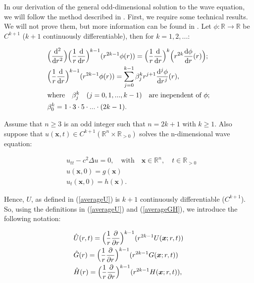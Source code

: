 \documentclass[a4paper, 12pt]{article}
\numberwithin{equation}{section}
\begin{document}
In our derivation of the general odd-dimensional solution to the wave equation,
we will follow the method described in \cite[Ch. 2.4.1.d]{Ev}. First, we require some
technical results. We will not prove them, but more information can be found in
\cite[Lemma 2]{Ev}. Let $\phi:\mathbb{R} \to \mathbb{R}$ be $C^{k+1}$ ($k+1$
continuously differentiable), then for $k=1, 2, ...$:

\begin{align}
    &\Big(\diff[2]{}{r}\Big)\Big( \frac{1}{r} \diff{}{r}\Big)^{k-1}(r^{2k-1}\phi(r))=\Big( \frac{1}{r} \diff{}{r}\Big)^k \Big(r^{2k} \diff{\phi}{r}(r) \Big); \label{i} \\
    &\Big( \frac{1}{r} \diff{}{r}\Big)^{k-1}(r^{2k-1}\phi(r))=\sum^{k-1}_{j=0} \beta_{j}^{k} r^{j+1} \diff[j]{\phi}{r}(r), \label{ii} \\
    & \textrm{where} \quad \beta_{j}^{k} \quad (j=0,1,...,k-1) \quad \textrm{are inependent of $\phi$}; \notag \\
    & \beta_{0}^{k}=1 \cdot 3 \cdot 5 \cdot ... \cdot (2k-1). \label{iii}
\end{align}

Assume that $n \ge 3$ is an odd integer such that $n=2k+1$ with $k \ge 1$. Also
suppose that $u(\boldsymbol{x},t) \in C^{k+1}(\mathbb{R}^n \times \mathbb{R}_{>0})$
solves the n-dimensional wave equation:

\begin{equation} \label{ndimeq}
    \begin{aligned}
        &u_{tt}-c^2\Delta u =0, \quad \textrm{with} \quad \boldsymbol{x} \in \mathbb{R}^n, \quad t \in \mathbb{R}_{>0}\\
        &u(\boldsymbol{x}, 0)=g(\boldsymbol{x})\\
        &u_t(\boldsymbol{x},0)=h(\boldsymbol{x}).
    \end{aligned}
\end{equation} 

Hence, $U$, as defined in (\ref{averageU}) is $k+1$ continuously differentiable
($C^{k+1}$). So, using the definitions in (\ref{averageU}) and
(\ref{averageGH}), we introduce the following notation:

\begin{equation} \label{ndimUGH}
    \begin{aligned}
        &\hat{U}(r,t)=\Big(\frac{1}{r} \diffp[1]{}{r} \Big)^{k-1} (r^{2k-1}U(\boldsymbol{x};r,t))\\
        &\hat{G}(r)=\Big(\frac{1}{r} \diffp[1]{}{r} \Big)^{k-1} (r^{2k-1}G(\boldsymbol{x};r,t))\\
        &\hat{H}(r)=\Big(\frac{1}{r} \diffp[1]{}{r} \Big)^{k-1} (r^{2k-1}H(\boldsymbol{x};r,t)),
    \end{aligned}
\end{equation}
\end{document}
